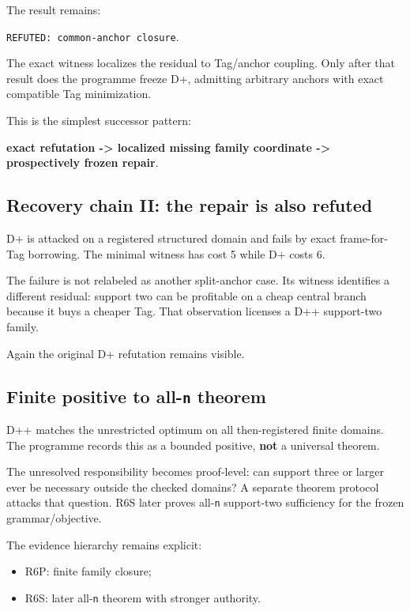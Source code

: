 \documentclass[preprint,12pt]{elsarticle}
\providecommand{\tightlist}{%
  \setlength{\itemsep}{0pt}\setlength{\parskip}{0pt}}
\begin{document}
The result remains:

\texttt{REFUTED:\ common-anchor\ closure}.

The exact witness localizes the residual to Tag/anchor coupling. Only
after that result does the programme freeze D+, admitting arbitrary
anchors with exact compatible Tag minimization.

This is the simplest successor pattern:

\textbf{exact refutation -\textgreater{} localized missing family
coordinate -\textgreater{} prospectively frozen repair}.

\hypertarget{recovery-chain-ii-the-repair-is-also-refuted}{%
\subsection{Recovery chain II: the repair is also
refuted}\label{recovery-chain-ii-the-repair-is-also-refuted}}

D+ is attacked on a registered structured domain and fails by exact
frame-for-Tag borrowing. The minimal witness has cost 5 while D+ costs
6.

The failure is not relabeled as another split-anchor case. Its witness
identifies a different residual: support two can be profitable on a
cheap central branch because it buys a cheaper Tag. That observation
licenses a D++ support-two family.

Again the original D+ refutation remains visible.

\hypertarget{finite-positive-to-all-n-theorem}{%
\subsection{\texorpdfstring{Finite positive to all-\texttt{n}
theorem}{Finite positive to all-n theorem}}\label{finite-positive-to-all-n-theorem}}

D++ matches the unrestricted optimum on all then-registered finite
domains. The programme records this as a bounded positive, \textbf{not}
a universal theorem.

The unresolved responsibility becomes proof-level: can support three or
larger ever be necessary outside the checked domains? A separate theorem
protocol attacks that question. R6S later proves all-\texttt{n}
support-two sufficiency for the frozen grammar/objective.

The evidence hierarchy remains explicit:

\begin{itemize}
\tightlist
\item
  R6P: finite family closure;
\item
  R6S: later all-\texttt{n} theorem with stronger authority.
\end{itemize}
\end{document}
